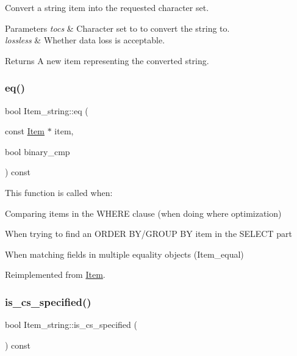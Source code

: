 Convert a string item into the requested character set.


\begin{DoxyParams}{Parameters}
{\em tocs} & Character set to to convert the string to. \\
\hline
{\em lossless} & Whether data loss is acceptable.\\
\hline
\end{DoxyParams}
\begin{DoxyReturn}{Returns}
A new item representing the converted string. 
\end{DoxyReturn}
\mbox{\label{classItem__string_abe8d23ca4b542969781ed21793fe96e5}} 
\subsubsection{\texorpdfstring{eq()}{eq()}}
{\footnotesize\ttfamily bool Item\+\_\+string\+::eq (\begin{DoxyParamCaption}\item[{const \mbox{\hyperlink{classItem}{Item}} $\ast$}]{item,  }\item[{bool}]{binary\+\_\+cmp }\end{DoxyParamCaption}) const\hspace{0.3cm}{\ttfamily [virtual]}}

This function is called when\+:
\begin{DoxyItemize}
\item Comparing items in the W\+H\+E\+RE clause (when doing where optimization)
\item When trying to find an O\+R\+D\+ER B\+Y/\+G\+R\+O\+UP BY item in the S\+E\+L\+E\+CT part
\item When matching fields in multiple equality objects (Item\+\_\+equal) 
\end{DoxyItemize}

Reimplemented from \mbox{\hyperlink{classItem_af0957bbdb9a256de0cd29f1adcae28be}{Item}}.

\mbox{\label{classItem__string_a1f29a4504141f987ed2df80187fd4749}} 
\subsubsection{\texorpdfstring{is\+\_\+cs\+\_\+specified()}{is\_cs\_specified()}}
{\footnotesize\ttfamily bool Item\+\_\+string\+::is\+\_\+cs\+\_\+specified (\begin{DoxyParamCaption}{ }\end{DoxyParamCaption}) const\hspace{0.3cm}{\ttfamily [inline]}}

